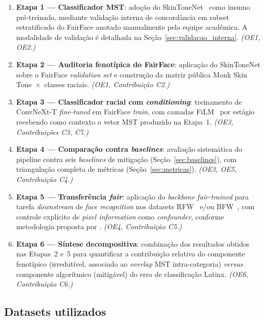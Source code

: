 \begin{enumerate}
\item \textbf{Etapa 1 --- Classificador MST}: adoção do SkinToneNet~\autocite{matias2026large} como insumo pré-treinado, mediante validação interna de concordância em subset estratificado do FairFace anotado manualmente pela equipe acadêmica. A modalidade de validação é detalhada na Seção~\ref{sec:validacao_interna}. \textit{(OE1, OE2.)}

\item \textbf{Etapa 2 --- Auditoria fenotípica do FairFace}: aplicação do SkinToneNet sobre o FairFace \emph{validation set} e construção da matriz pública Monk Skin Tone~$\times$~classes raciais. \textit{(OE1, Contribuição C2.)}

\item \textbf{Etapa 3 --- Classificador racial com \emph{conditioning}}: treinamento de ConvNeXt-T \emph{fine-tuned} em FairFace \emph{train}, com camadas FiLM~\autocite{perez2018film} por estágio recebendo como contexto o vetor MST produzido na Etapa~1. \textit{(OE3, Contribuições C3, C7.)}

\item \textbf{Etapa 4 --- Comparação contra \emph{baselines}}: avaliação sistemática do pipeline contra seis \emph{baselines} de mitigação (Seção~\ref{sec:baselines}), com triangulação completa de métricas (Seção~\ref{sec:metricas}). \textit{(OE3, OE5, Contribuição C4.)}

\item \textbf{Etapa 5 --- Transferência \emph{fair}}: aplicação do \emph{backbone} \emph{fair-trained} para tarefa \emph{downstream} de \emph{face recognition} nos datasets RFW~\autocite{wang2019racial} e/ou BFW~\autocite{robinson2020face}, com controle explícito de \emph{pixel information} como \emph{confounder}, conforme metodologia proposta por \textcite{pangelinan2023exploring}. \textit{(OE4, Contribuição C5.)}

\item \textbf{Etapa 6 --- Síntese decompositiva}: combinação dos resultados obtidos nas Etapas~2 e~5 para quantificar a contribuição relativa do componente fenotípico (irredutível, associado ao \emph{overlap} MST intra-categoria) \emph{versus} componente algorítmico (mitigável) do erro de classificação Latinx. \textit{(OE6, Contribuição C6.)}
\end{enumerate}

\subsection{Datasets utilizados}
\label{sec:datasets}

